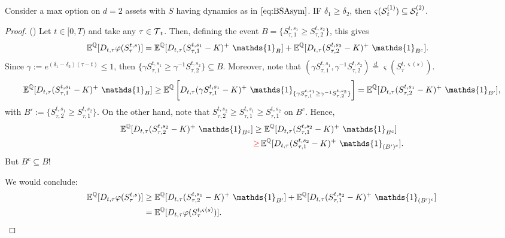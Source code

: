 \begin{proposition} Consider a max option on $d=2$ assets with $S$ having dynamics as in $\eqref{eq:BSAsym}$. IF $\delta_1 \ge \delta_2$, then $\varsigma(\operatorname{\mathcal{S}}^{(1)}_t) \subseteq \operatorname{\mathcal{S}}^{(2)}_t$. 
\end{proposition}

\begin{proof} ()
Let $t\in [0,T)$ and take any $\tau \in \operatorname{\mathcal{T}}_t$. Then, defining the event $B = \{S^{t,s_1}_{\tau,1} \ge  S^{t,s_2}_{\tau,2}\}$, this gives
\begin{align*}
    \E^{\Q}[D_{t,\tau} \varphi(S^{t,s}_{\tau}) ] &= \E^{\Q}[D_{t,\tau} (S^{t,s_1}_{\tau,1}-K)^+ \ \mathds{1}_{B} ] + \E^{\Q}[D_{t,\tau} (S^{t,s_2}_{\tau,2}-K)^+ \ \mathds{1}_{B^c} ]. 
\end{align*}
Since $\gamma := e^{(\delta_1-\delta_2)(\tau-t)} \le 1$, then  $\{\gamma S^{t,s_1}_{\tau,1} \ge  \gamma^{-1} S^{t,s_2}_{\tau,2}\} \subseteq B$. Moreover, note that $(\gamma S^{t,s_1}_{\tau,1},\gamma^{-1} S^{t,s_2}_{\tau,2}) \overset{d}{=} \varsigma(S^{t,\varsigma(s)}_{\tau})$. 
\begin{equation*}
    \E^{\Q}[D_{t,\tau} (S^{t,s_1}_{\tau,1}-K)^+ \ \mathds{1}_{B} ] \ge  \E^{\Q}\left[D_{t,\tau} (\gamma S^{t,s_1}_{\tau,1}-K)^+ \ \mathds{1}_{\{\gamma S^{t,s_1}_{\tau,1} \ge  \gamma^{-1} S^{t,s_2}_{\tau,2}\}} \right ] = \E^{\Q}[D_{t,\tau} ( S^{t,s_1}_{\tau,2}-K)^+ \ \mathds{1}_{B'} ],
\end{equation*}
with $B':= \{ S^{t,s_1}_{\tau,2} \ge  S^{t,s_2}_{\tau,1}\}$. On the other hand, note that $S^{t,s_2}_{\tau,2} \ge S^{t,s_1}_{\tau,1} \ge S^{t,s_2}_{\tau,1} $ on $B^c$. Hence, 
\begin{align*}
    \E^{\Q}[D_{t,\tau} (S^{t,s_2}_{\tau,2}-K)^+ \ \mathds{1}_{B^c} ] &\ge  \E^{\Q}[D_{t,\tau} (S^{t,s_2}_{\tau,1}-K)^+ \ \mathds{1}_{B^c} ]\\
    &\rr{\ge} \E^{\Q}[D_{t,\tau} (S^{t,s_2}_{\tau,1}-K)^+ \ \mathds{1}_{(B')^c} ].
\end{align*}
But $B^c \subseteq B$!

We would conclude: 
\begin{align*}
    \E^{\Q}[D_{t,\tau} \varphi(S^{t,s}_{\tau}) ] &\ge \E^{\Q}[D_{t,\tau} ( S^{t,s_1}_{\tau,2}-K)^+ \ \mathds{1}_{B'} ] + \E^{\Q}[D_{t,\tau} (S^{t,s_2}_{\tau,1}-K)^+ \ \mathds{1}_{(B')^c} ]\\ 
    &= \E^{\Q}[D_{t,\tau} \varphi(S^{t,\varsigma(s)}_{\tau}) ]. 
\end{align*}


\end{proof}
